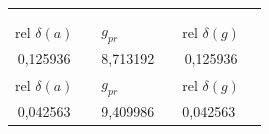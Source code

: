 \documentclass[a4paper,12pt]{article}
\begin{document}
\begin{table}[]
\begin{tabular}{@{}|c|l|l|l|l|l|@{}}
                                             &                            &                                               &                          & \multicolumn{1}{c}{}                          &                        \\
                                             &                            &                                               &                          & \multicolumn{1}{c}{}                          &                        \\\hline
\multicolumn{1}{l}{rel $\delta(a)$}          &                            & $g_{pr}$                                      &                          & rel $\delta(g)$                               &                        \\
\multirow{3}{*}{0,125936}                    &                            & \multirow{3}{*}{8,713192}                     &                          & \multicolumn{1}{c}{\multirow{3}{*}{0,125936}} &                        \\\hline
                                             &                            &                                               &                          & \multicolumn{1}{c}{}                          &                        \\
                                             &                            &                                               &                          & \multicolumn{1}{c}{}                          &                        \\\hline
\multicolumn{1}{l}{rel $\delta(a)$}          &                            & $g_{pr}$                                      &                          & rel $\delta(g)$                               &                        \\
\multirow{3}{*}{0,042563}                    &                            & \multicolumn{1}{r}{\multirow{3}{*}{9,409986}} &                          & \multirow{3}{*}{0,042563}                     &                        \\\hline
                                             &                            & \multicolumn{1}{r}{}                          &                          &                                               &                        \\
                                             &                            & \multicolumn{1}{r}{}                          &                          &                                               &                        \\\hline

\end{tabular}
\end{table}
\end{document}
